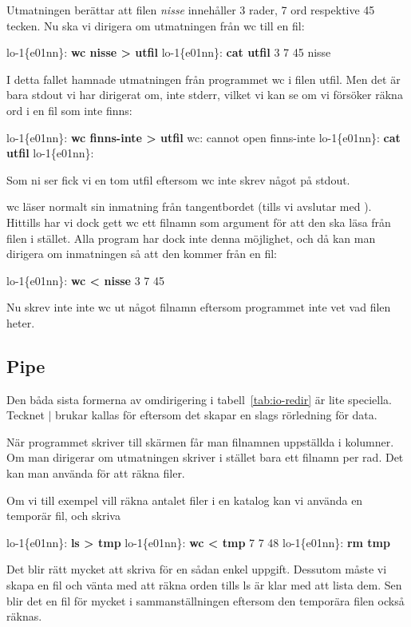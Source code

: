 \documentclass[a4paper,twocolumn]{book}
\begin{document}
Utmatningen berättar att filen \emph{nisse} innehåller 3 rader, 7 ord
respektive 45 tecken. Nu ska vi dirigera om utmatningen från wc till
en fil:
\begin{example}
lo-1\{e01nn\}: \textbf{wc nisse > utfil}
lo-1\{e01nn\}: \textbf{cat utfil}
       3       7      45 nisse
\end{example}
I detta fallet hamnade utmatningen från programmet wc i filen
utfil. Men det är bara stdout vi har dirigerat om, inte stderr, vilket
vi kan se om vi försöker räkna ord i en fil som inte finns:
\begin{example}
lo-1\{e01nn\}: \textbf{wc finns-inte > utfil}
wc: cannot open finns-inte
lo-1\{e01nn\}: \textbf{cat utfil}
lo-1\{e01nn\}: 
\end{example}
Som ni ser fick vi en tom utfil eftersom wc inte skrev något på
stdout.

wc läser normalt sin inmatning från tangentbordet (tills vi avslutar
med ). Hittills har vi dock gett wc ett filnamn som
argument för att den ska läsa från filen i stället. Alla program har
dock inte denna möjlighet, och då kan man dirigera om inmatningen så
att den kommer från en fil:
\begin{example}
lo-1\{e01nn\}: \textbf{wc < nisse}
       3       7      45
\end{example}
Nu skrev inte inte wc ut något filnamn eftersom programmet inte vet
vad filen heter.

\subsection{Pipe}

Den båda sista formerna av omdirigering i tabell~\ref{tab:io-redir} är lite
speciella. Tecknet $\mid$ brukar kallas för  eftersom det
skapar en slags rörledning för data.

När programmet  skriver till skärmen får man filnamnen
uppställda i kolumner. Om man dirigerar om utmatningen skriver
 i stället bara ett filnamn per rad. Det kan
man använda för att räkna filer.

Om vi till exempel vill räkna antalet filer i en katalog kan vi
använda en temporär fil, och skriva
\begin{example}
lo-1\{e01nn\}: \textbf{ls > tmp}
lo-1\{e01nn\}: \textbf{wc < tmp}
       7       7      48
lo-1\{e01nn\}: \textbf{rm tmp}
\end{example}
Det blir rätt mycket att skriva för en sådan enkel uppgift.
Dessutom måste vi skapa en fil och vänta med att räkna orden tills ls
är klar med att lista dem. Sen blir det en fil för mycket i
sammanställningen eftersom den temporära filen också räknas.
\end{document}
